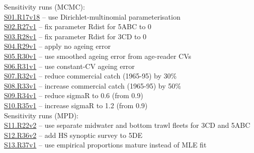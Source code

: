 \documentclass[11pt]{book}
\newcommand{\pc}{\%}
\def\hsd{\hspace*{1ex}}
\def\tab{\hsd\hsd}
\begin{document}
Sensitivity runs (MCMC):\\
\tab \href{https://github.com/pbs-software/pbs-synth/tree/master/PBSsynth/inst/input/2023/POP/CST/Sens/S01.R17v18/17.00}{S01.R17v18} -- use Dirichlet-multinomial parameterisation\\
\tab \href{https://github.com/pbs-software/pbs-synth/tree/master/PBSsynth/inst/input/2023/POP/CST/Sens/S02.R27v1/27.01}{S02.R27v1} -- fix parameter Rdist for 5ABC to 0\\
\tab \href{https://github.com/pbs-software/pbs-synth/tree/master/PBSsynth/inst/input/2023/POP/CST/Sens/S03.R28v1/28.01}{S03.R28v1} -- fix parameter Rdist for 3CD to 0\\
\tab \href{https://github.com/pbs-software/pbs-synth/tree/master/PBSsynth/inst/input/2023/POP/CST/Sens/S04.R29v1/29.01}{S04.R29v1} -- apply no ageing error\\
\tab \href{https://github.com/pbs-software/pbs-synth/tree/master/PBSsynth/inst/input/2023/POP/CST/Sens/S05.R30v1/30.01}{S05.R30v1} -- use smoothed ageing error from age-reader CVs\\
\tab \href{https://github.com/pbs-software/pbs-synth/tree/master/PBSsynth/inst/input/2023/POP/CST/Sens/S06.R31v1/31.01}{S06.R31v1} -- use constant-CV ageing error\\
\tab \href{https://github.com/pbs-software/pbs-synth/tree/master/PBSsynth/inst/input/2023/POP/CST/Sens/S07.R32v1/32.01}{S07.R32v1} -- reduce commercial catch (1965-95) by 30\pc{}\\
\tab \href{https://github.com/pbs-software/pbs-synth/tree/master/PBSsynth/inst/input/2023/POP/CST/Sens/S08.R33v1/33.01}{S08.R33v1} -- increase commercial catch (1965-95) by 50\pc{}\\
\tab \href{https://github.com/pbs-software/pbs-synth/tree/master/PBSsynth/inst/input/2023/POP/CST/Sens/S09.R34v1/34.01}{S09.R34v1} -- reduce sigmaR to 0.6 (from 0.9)\\
\tab \href{https://github.com/pbs-software/pbs-synth/tree/master/PBSsynth/inst/input/2023/POP/CST/Sens/S10.R35v1/35.01}{S10.R35v1} -- increase sigmaR to 1.2 (from 0.9)\\

Sensitivity runs (MPD):\\
\tab \href{https://github.com/pbs-software/pbs-synth/tree/master/PBSsynth/inst/input/2023/POP/CST/Sens/S11.R22v2/22.01}{S11.R22v2} -- use separate midwater and bottom trawl fleets for 3CD and 5ABC\\
\tab \href{https://github.com/pbs-software/pbs-synth/tree/master/PBSsynth/inst/input/2023/POP/CST/Sens/S12.R36v2/36.01}{S12.R36v2} -- add HS synoptic survey to 5DE\\
\tab \href{https://github.com/pbs-software/pbs-synth/tree/master/PBSsynth/inst/input/2023/POP/CST/Sens/S13.R37v1/37.01}{S13.R37v1} -- use empirical proportions mature instead of MLE fit\\
\end{document}
